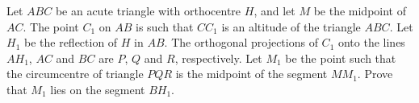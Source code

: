 Let $ABC$ be an acute triangle with orthocentre $H$, and let $M$ be the midpoint of $AC$. The point $C_1$ on $AB$ is such that $CC_1$ is an altitude of the triangle $ABC$. Let $H_1$ be the reflection of $H$ in $AB$. The orthogonal projections of $C_1$ onto the lines $AH_1$, $AC$ and $BC$ are $P$, $Q$ and $R$, respectively. Let $M_1$ be the point such that the circumcentre  of triangle $PQR$ is the midpoint of the segment $MM_1$.
Prove that $M_1$ lies on the segment $BH_1$.